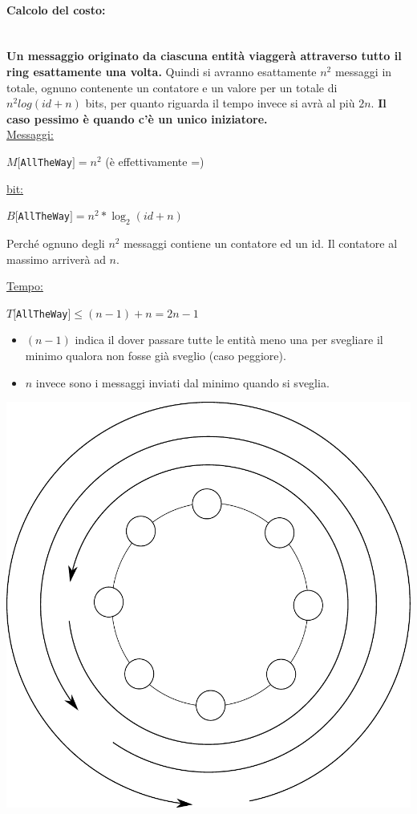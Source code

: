 \paragraph{Calcolo del costo:}\ \\
\textbf{Un messaggio originato da ciascuna entità
    viaggerà attraverso tutto il ring esattamente una volta.} Quindi si avranno
esattamente $n^2$ messaggi in totale, ognuno contenente un contatore e un valore
per un totale di $n^2log(id+n)$ bits, per quanto riguarda il tempo invece si
avrà al più $2n$. \textbf{Il caso pessimo è quando c'è un unico iniziatore.}\\
\underline{Messaggi:}
\begin{center}
    $M[$\texttt{AllTheWay}$] = n^2$ (è effettivamente =)
\end{center}
\underline{bit:}
\begin{center}
    $B[$\texttt{AllTheWay}$] = n^2*\log_2(id+n)$
\end{center}

Perché ognuno degli $n^2$ messaggi contiene un contatore ed un id. Il contatore
al massimo arriverà ad $n$.


\underline{Tempo:}
\begin{center}
    $T[$\texttt{AllTheWay}$] \leq (n - 1) + n   = 2n - 1$
\end{center}
\begin{itemize}
    \item $(n-1)$ indica il dover passare tutte le entità meno una per svegliare il
          minimo qualora non fosse già sveglio (caso peggiore).
    \item $n$ invece sono i messaggi inviati dal minimo quando si sveglia.
\end{itemize}

\begin{center}
    \includegraphics[scale=0.5]{capitoli/leader-election/imgs/n_44}
\end{center}

